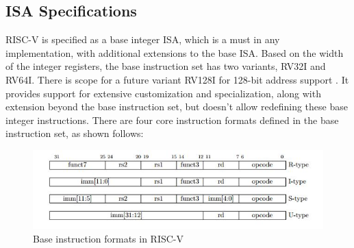 \subsection{ISA Specifications}
 \label{sect6_1_2}
RISC-V is specified as a base integer ISA, which is a must in any implementation, with additional extensions to the base ISA. Based on the width of the integer registers, the base instruction set has two variants, RV32I and RV64I. There is scope for a future variant RV128I for 128-bit address support \cite{riscv_isa_manual}. It provides support for extensive customization and specialization, along with extension beyond the base instruction set, but doesn't allow redefining these base integer instructions. \newline\newline
There are four core instruction formats defined in the base instruction set, as shown follows:
\begin{figure}[h!]
\centering
\includegraphics[width=\linewidth]{figures/RV32I_Instruction_Types.JPG}
\caption{Base instruction formats in RISC-V \cite{riscv_tools_bootcamp}}
\label{fig:riscv1}
\end{figure}

